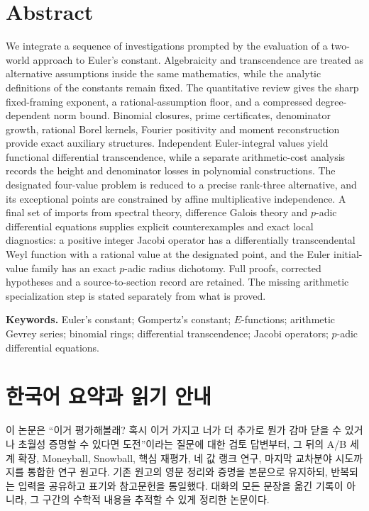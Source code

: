 \documentclass[11pt,a4paper]{article}
\theoremstyle{definition}
\theoremstyle{remark}
\theoremstyle{plain}
\numberwithin{equation}{section}
\begin{document}
\section*{Abstract}
We integrate a sequence of investigations prompted by the evaluation of a
two-world approach to Euler's constant. Algebraicity and transcendence are
treated as alternative assumptions inside the same mathematics, while the
analytic definitions of the constants remain fixed. The quantitative
review gives the sharp fixed-framing exponent, a rational-assumption
floor, and a compressed degree-dependent norm bound. Binomial closures,
prime certificates, denominator growth, rational Borel kernels, Fourier
positivity and moment reconstruction provide exact auxiliary structures.
Independent Euler-integral values yield functional differential
transcendence, while a separate arithmetic-cost analysis records the
height and denominator losses in polynomial constructions. The designated
four-value problem is reduced to a precise rank-three alternative, and
its exceptional points are constrained by affine multiplicative
independence. A final set of imports from spectral theory, difference
Galois theory and $p$-adic differential equations supplies explicit
counterexamples and exact local diagnostics: a positive integer Jacobi
operator has a differentially transcendental Weyl function with a rational
value at the designated point, and the Euler initial-value family has an
exact $p$-adic radius dichotomy. Full proofs, corrected hypotheses and a
source-to-section record are retained. The missing arithmetic
specialization step is stated separately from what is proved.

\medskip
\noindent\textbf{Keywords.} Euler's constant; Gompertz's constant;
$E$-functions; arithmetic Gevrey series; binomial rings; differential
transcendence; Jacobi operators; $p$-adic differential equations.

\section*{한국어 요약과 읽기 안내}
이 논문은 ``이거 평가해볼래? 혹시 이거 가지고 너가 더 추가로 뭔가
감마 닫을 수 있거나 초월성 증명할 수 있다면 도전''이라는 질문에 대한
검토 답변부터, 그 뒤의 A/B 세계 확장, Moneyball, Snowball, 핵심 재평가,
네 값 랭크 연구, 마지막 교차분야 시도까지를 통합한 연구 원고다.
기존 원고의 영문 정리와 증명을 본문으로 유지하되, 반복되는 입력을
공유하고 표기와 참고문헌을 통일했다. 대화의 모든 문장을 옮긴 기록이
아니라, 그 구간의 수학적 내용을 추적할 수 있게 정리한 논문이다.
\end{document}
